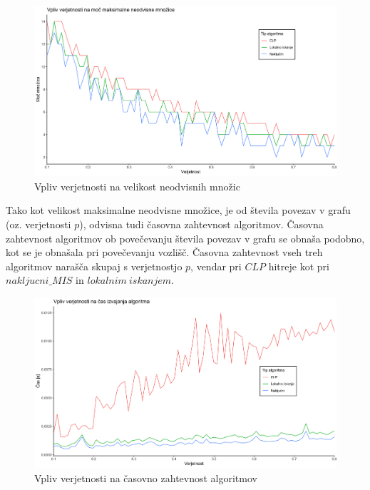 \documentclass[a4paper, 12pt]{article}
\begin{document}
\begin{figure}[h!]
	\begin{center}
		\includegraphics[scale=0.10]{R_koda/ver-moc.png}
		\caption{Vpliv verjetnosti na velikost neodvisnih množic}
	\end{center}
\end{figure}

Tako kot velikost maksimalne neodvisne množice, je od števila povezav v grafu (oz. verjetnosti $p$), odvisna tudi časovna zahtevnost algoritmov. Časovna zahtevnost algoritmov ob povečevanju števila povezav v grafu
se obnaša podobno, kot se je obnašala pri povečevanju vozlišč. Časovna zahtevnost vseh treh algoritmov narašča skupaj s verjetnostjo $p$, vendar pri $CLP$ hitreje kot pri
$nakljucni\_MIS$ in $lokalnim\ iskanjem$.

\begin{figure}[h!]
	\begin{center}
		\includegraphics[scale=0.10]{R_koda/ver-cas.png}
		\caption{Vpliv verjetnosti na časovno zahtevnost algoritmov}
	\end{center}
\end{figure}
\end{document}
